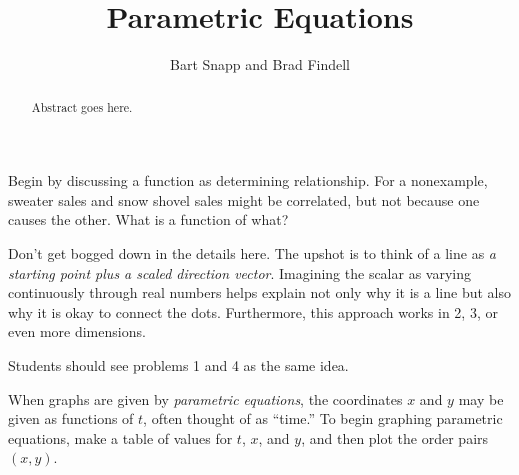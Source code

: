 \documentclass{ximera}
\title{Parametric Equations}
\author{Bart Snapp and Brad Findell}
\begin{document}
\begin{abstract}
Abstract goes here.  
\end{abstract}
\maketitle

\begin{teachingnote}
Begin by discussing a function as determining relationship.  For a nonexample, sweater sales and snow shovel sales might be correlated, but not because one causes the other.  What is a function of what?  

Don't get bogged down in the details here.  The upshot is to think of a line as \emph{a starting point plus a scaled direction vector}.  Imagining the scalar as varying continuously through real numbers helps explain not only why it is a line but also why it is okay to connect the dots.  Furthermore, this approach works in 2, 3, or even more dimensions.  

Students should see problems 1 and 4 as the same idea.  
\end{teachingnote}

%

\begin{definition}
When graphs are given by \emph{parametric equations}, the coordinates $x$ and $y$ may be given as functions of $t$, often thought of as ``time.''  To begin graphing parametric equations, make a table of values for $t$, $x$, and $y$, and then plot the order pairs $(x, y)$.  
\end{definition}
\end{document}
